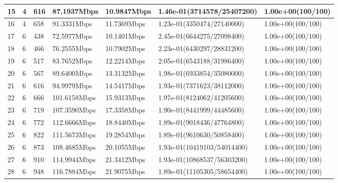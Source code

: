 \documentclass{article}
\begin{document}
\begin{table}[H]
\begin{tabular}{|l|l|l|l|l|l|l|}
		\hline
		15		& 4		& 616	& 87.1937Mbps	& 10.9847Mbps	& 1.46e-01(3714578/25407200)	& 1.00e+00(100/100)	\\
		\hline
		16		& 4		& 658	& 91.3331Mbps	& 11.7369Mbps	& 1.23e-01(3350474/27140000)	& 1.00e+00(100/100)	\\
		\hline
		17		& 6		& 438	& 72.5977Mbps	& 10.1401Mbps	& 2.45e-01(6644275/27098400)	& 1.00e+00(100/100)	\\
		\hline
		18		& 6		& 466	& 76.2555Mbps	& 10.7902Mbps	& 2.23e-01(6430297/28831200)	& 1.00e+00(100/100)	\\
		\hline
		19		& 6		& 517	& 83.7652Mbps	& 12.2214Mbps	& 2.05e-01(6543188/31986400)	& 1.00e+00(100/100)	\\
		\hline
		20		& 6		& 567	& 89.6400Mbps	& 13.3132Mbps	& 1.98e-01(6933854/35080000)	& 1.00e+00(100/100)	\\
		\hline
		21		& 6		& 616	& 94.9979Mbps	& 14.5417Mbps	& 1.93e-01(7371623/38112000)	& 1.00e+00(100/100)	\\
		\hline
		22		& 6		& 666	& 101.6158Mbps	& 15.9313Mbps	& 1.97e-01(8124062/41205600)	& 1.00e+00(100/100)	\\
		\hline
		23		& 6		& 719	& 107.3590Mbps	& 17.3358Mbps	& 1.90e-01(8441999/44485600)	& 1.00e+00(100/100)	\\
		\hline
		24		& 6		& 772	& 112.6666Mbps	& 18.8440Mbps	& 1.89e-01(9018436/47764800)	& 1.00e+00(100/100)	\\
		\hline
		25		& 6		& 822	& 111.5673Mbps	& 19.2854Mbps	& 1.89e-01(9610630/50858400)	& 1.00e+00(100/100)	\\
		\hline
		26		& 6		& 873	& 108.4685Mbps	& 20.1055Mbps	& 1.93e-01(10419103/54014400)	& 1.00e+00(100/100)	\\
		\hline
		27		& 6		& 910	& 114.9944Mbps	& 21.3412Mbps	& 1.93e-01(10868537/56303200)	& 1.00e+00(100/100)	\\
		\hline
		28		& 6		& 948	& 116.7884Mbps	& 21.9075Mbps	& 1.89e-01(11105305/58654400)	& 1.00e+00(100/100)	\\
		\hline  %
	\end{tabular}
\end{table}



\end{document}
